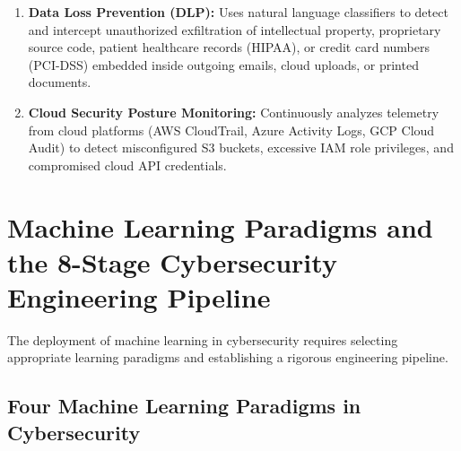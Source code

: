 \begin{enumerate}
\item \textbf{Data Loss Prevention (DLP):}
Uses natural language classifiers to detect and intercept unauthorized exfiltration of intellectual property, proprietary source code, patient healthcare records (HIPAA), or credit card numbers (PCI-DSS) embedded inside outgoing emails, cloud uploads, or printed documents.

\item \textbf{Cloud Security Posture Monitoring:}
Continuously analyzes telemetry from cloud platforms (AWS CloudTrail, Azure Activity Logs, GCP Cloud Audit) to detect misconfigured S3 buckets, excessive IAM role privileges, and compromised cloud API credentials.
\end{enumerate}

\newpage
\section{Machine Learning Paradigms and the 8-Stage Cybersecurity Engineering Pipeline}

The deployment of machine learning in cybersecurity requires selecting appropriate learning paradigms and establishing a rigorous engineering pipeline.

\subsection{Four Machine Learning Paradigms in Cybersecurity}


